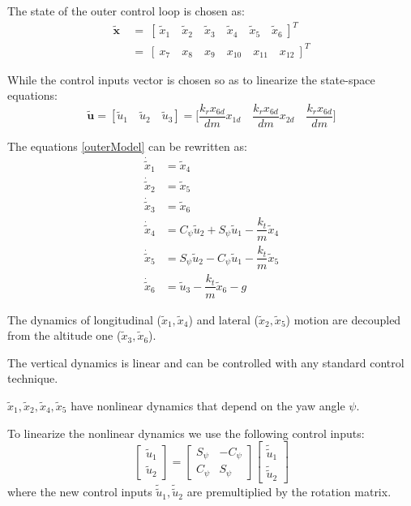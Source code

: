 \documentclass[11pt,a4paper]{scrartcl}
\begin{document}
The state of the outer control loop is chosen as:
\begin{align*}
\mathbf{\tilde{x}} \ &= \ [ \ \tilde{x}_1 \quad \tilde{x}_2 \quad \tilde{x}_3 \quad \tilde{x}_4 \quad \tilde{x}_5 \quad \tilde{x}_6 \ ]^T \\
&= \ [ \ x_7 \quad x_8 \quad x_9 \quad x_{10} \quad x_{11} \quad x_{12} \ ]^T
\end{align*}

While the control inputs vector is chosen so as to linearize the state-space equations:
\begin{equation}
	\mathbf{\tilde{u}} = [\tilde{u}_1 \quad \tilde{u}_2 \quad \tilde{u}_3] = \Big[ \dfrac{k_r x_{6d}}{dm}  x_{1d} \quad  \dfrac{k_r x_{6d} }{dm} x_{2d} \quad  \dfrac{k_r x_{6d}}{dm} \Big]
	\label{OuterInputs}
\end{equation}

The equations \eqref{outerModel} can be rewritten as:
\begin{subequations}
	\begin{align}
		 \dot{\tilde{x}}_1 & = \tilde{x}_4 \\
		 \dot{\tilde{x}}_2 & = \tilde{x}_5 \\
		 \dot{\tilde{x}}_3 & = \tilde{x}_6 \\
		 \dot{\tilde{x}}_4 & = C_\psi \tilde{u}_2 + S_\psi \tilde{u}_1 - \dfrac{k_t}{m} \tilde{x}_4 \\
		 \dot{\tilde{x}}_5 & = S_\psi \tilde{u}_2 - C_\psi \tilde{u}_1 - \dfrac{k_t}{m} \tilde{x}_5 \\
		 \dot{\tilde{x}}_6 & = \tilde{u}_3 - \dfrac{k_t}{m} \tilde{x}_6 - g
	\end{align}
	\label{outerControl_}
\end{subequations}

The dynamics of longitudinal ($ \tilde{x}_1, \tilde{x}_4 $) and lateral ($ \tilde{x}_2, \tilde{x}_5 $) motion are decoupled from the altitude one ($ \tilde{x}_3,  \tilde{x}_6 $).

The vertical dynamics is linear and can be controlled with any standard control technique. 

$ \tilde{x}_1, \tilde{x}_2, \tilde{x}_4, \tilde{x}_5 $ have nonlinear dynamics that depend on the yaw angle $ \psi $.

To linearize the nonlinear dynamics we use the following control inputs:
\begin{equation}
	\begin{bmatrix}
	\tilde{u}_1 \\ \tilde{u}_2
	\end{bmatrix} = 
	\begin{bmatrix}
	S_{\psi} & -C_{\psi} \\
	C_{\psi} & S_{\psi} 
	\end{bmatrix}
	\begin{bmatrix}
	\tilde{\tilde{u}}_1 \\ \tilde{\tilde{u}}_2
	\end{bmatrix}
	\label{rotation_matrix_outer}
\end{equation}
where the new control inputs $ \tilde{\tilde{u}}_1, \tilde{\tilde{u}}_2 $ are premultiplied by the rotation matrix.
\end{document}
